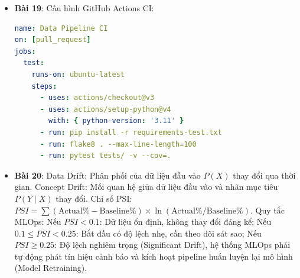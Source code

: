 \begin{dapanbox}
\begin{itemize}
\begin{lstlisting}[language=python]
class MLUser(HttpUser):
    wait_time = between(0.1, 0.5)
    @task
    def predict_churn(self):
        payload = {"total_spend": 250.0, "tenure": 14}
        self.client.post("/predict", json=payload)
    \end{lstlisting}
    Chạy lệnh: \texttt{locust -f locustfile.py --headless -u 200 -r 20 --run-time 1m}. Mục tiêu: Đảm bảo P99 latency $< 50$ms và 0\% lỗi ở tải 500 RPS.
    \item \textbf{Bài 19}: Cấu hình GitHub Actions CI:
    \begin{lstlisting}[language=yaml]
name: Data Pipeline CI
on: [pull_request]
jobs:
  test:
    runs-on: ubuntu-latest
    steps:
      - uses: actions/checkout@v3
      - uses: actions/setup-python@v4
        with: { python-version: '3.11' }
      - run: pip install -r requirements-test.txt
      - run: flake8 . --max-line-length=100
      - run: pytest tests/ -v --cov=.
    \end{lstlisting}
    \item \textbf{Bài 20}: Data Drift: Phân phối của dữ liệu đầu vào $P(X)$ thay đổi qua thời gian. Concept Drift: Mối quan hệ giữa dữ liệu đầu vào và nhãn mục tiêu $P(Y \mid X)$ thay đổi. Chỉ số PSI: $PSI = \sum (\text{Actual}\% - \text{Baseline}\%) \times \ln(\text{Actual}\% / \text{Baseline}\%)$. Quy tắc MLOps: Nếu $PSI < 0.1$: Dữ liệu ổn định, không thay đổi đáng kể; Nếu $0.1 \le PSI < 0.25$: Bắt đầu có độ lệch nhẹ, cần theo dõi sát sao; Nếu $PSI \ge 0.25$: Độ lệch nghiêm trọng (Significant Drift), hệ thống MLOps phải tự động phát tín hiệu cảnh báo và kích hoạt pipeline huấn luyện lại mô hình (Model Retraining).
\end{itemize}
\end{dapanbox}
